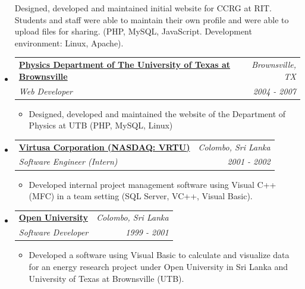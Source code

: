 \documentclass[11pt]{article}
\makeatletter
\newcommand{\ressubheading}[4]{
\begin{tabular*}{6.5in}{l@{\extracolsep{\fill}}r}
		\textbf{#1} & \textit{#2} \\
		\textit{#3} & \textit{#4} \\
\end{tabular*}\vspace{-6pt}}
\makeatother
\begin{document}
\begin{itemize}
{\begin{itemize}
{					Designed, developed and maintained initial website for CCRG at RIT. Students and staff were able to maintain their own profile and were able to upload files for sharing. (PHP, MySQL, JavaScript. Development environment: Linux, Apache).}
				\end{itemize}
				}
		\item	
			\ressubheading{\href{http://www.phys.utb.edu/}{Physics Department of The University of Texas at Brownsville}}{Brownsville, TX}{Web Developer}{2004 - 2007}
				{ \footnotesize				
				\begin{itemize}
					\item {
					Designed, developed and maintained the website of the Department of Physics at UTB (PHP, MySQL, Linux)}
				\end{itemize}
				}		
		\item	
			\ressubheading{\href{http://www.virtusa.com/}{Virtusa Corporation (NASDAQ: VRTU)}}{Colombo, Sri Lanka}{Software Engineer (Intern)}{2001 - 2002}
				{ \footnotesize				
				\begin{itemize}
					\item {Developed internal project management software using Visual C++ (MFC) in a team setting (SQL Server, VC++, Visual Basic).}
				\end{itemize}
				}	
		\item	
			\ressubheading{\href{http://www.ou.ac.lk/}{Open University}}{Colombo, Sri Lanka}{Software Developer}{1999 - 2001}
				{ \footnotesize				
				\begin{itemize}
					\item {Developed a software using Visual Basic to calculate and visualize data for an energy research project under Open University in Sri Lanka and University of Texas at Brownsville (UTB).}
				\end{itemize}
				}			
	\end{itemize}  %
\end{document}
